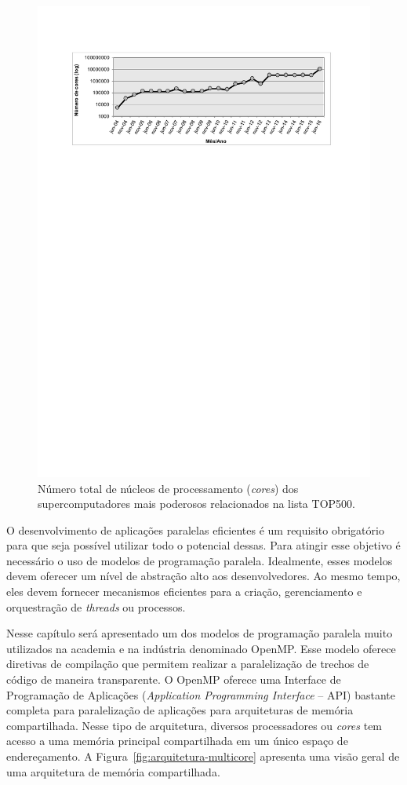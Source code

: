 \documentclass{SBCbookchapter}
\begin{document}
	\begin{figure}[h]
		\centering
		\includegraphics[width=13cm, height=!]{figs/cores-top500.pdf}
		\caption{Número total de núcleos de processamento (\emph{cores}) dos supercomputadores mais poderosos relacionados na lista TOP500.}
		\label{fig:top500}
	\end{figure}

	O desenvolvimento de aplicações paralelas eficientes é um requisito
	obrigatório para que seja possível utilizar todo o potencial dessas.
	Para atingir esse objetivo é necessário o uso de modelos de programação
	paralela. Idealmente, esses modelos devem oferecer um nível de abstração
	alto aos desenvolvedores. Ao mesmo tempo, eles devem fornecer mecanismos
	eficientes para a criação, gerenciamento e orquestração de
	\textit{threads} ou processos.

	Nesse capítulo será apresentado um dos modelos de programação paralela
	muito utilizados na academia e na indústria denominado OpenMP. Esse
	modelo oferece diretivas de compilação que permitem realizar a
	paralelização de trechos de código de maneira transparente. O OpenMP
	oferece uma Interface de Programação de Aplicações (\textit{Application
	Programming Interface} -- API) bastante completa para paralelização de
	aplicações para arquiteturas de memória compartilhada. Nesse tipo de
	arquitetura, diversos processadores ou \textit{cores} tem acesso a uma
	memória principal compartilhada em um único espaço de endereçamento. A
	Figura~\ref{fig:arquitetura-multicore} apresenta uma visão geral de uma
	arquitetura de memória compartilhada.
\end{document}
